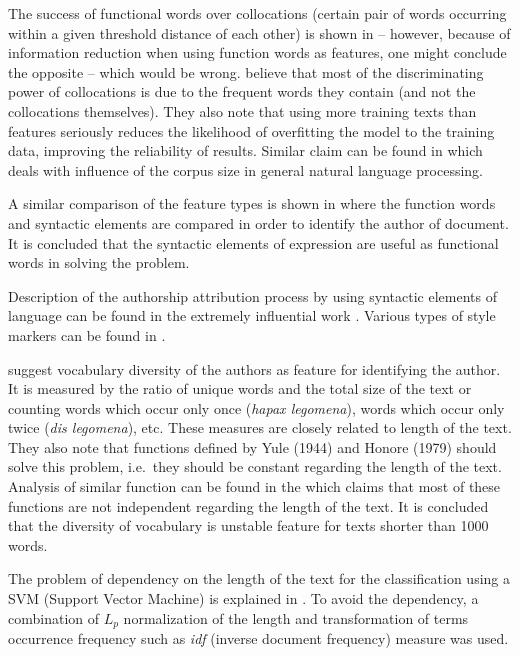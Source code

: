 \documentclass[11pt,english]{article}
\begin{document}
\begin{multicols}{2}
The success of functional words over collocations (certain pair of words
occurring within a given threshold distance of each other) is shown in
\citep{argamon2005measuring} -- however, because of information reduction when 
using function words as features, one might conclude the opposite -- which would be
wrong. \citet{argamon2005measuring} believe that most of the discriminating power
of collocations is due to the frequent words they contain (and not the
collocations themselves). They also note that using more training texts than
features seriously reduces the likelihood of overfitting the model to the
training data, improving the reliability of results. Similar claim can be found
in \citep{banko2001scaling} which deals with influence of the corpus size in
general natural language processing.

A similar comparison of the feature types is shown in
\citep{uzuner2005comparative} where the function words and syntactic
elements are compared in order to identify the author of document. It is
concluded that the syntactic elements of expression are useful as functional words in solving the
problem.

Description of the authorship attribution process by using syntactic elements
of language can be found in the extremely influential work
\citep{stamatatos2001computer}. Various types of style markers can be found in
\citep{luyckx2005shallow}.

\citet{stamatatos2001computer} suggest vocabulary diversity of the authors as
feature for identifying the author. It is measured by the ratio of unique words
and the total size of the text or counting words which occur only once
(\emph{hapax legomena}), words which occur only twice (\emph{dis legomena}), etc.
These measures are closely related to length of the text. They also note that
functions defined by Yule (1944) and Honore (1979) should solve this problem,
i.e.\ they should be constant regarding the length of the text. Analysis of
similar function can be found in the \citep{tweedie1998variable} which claims
that most of these functions are not independent regarding the length of the
text. It is concluded that the diversity of vocabulary is unstable feature for
texts shorter than 1000 words.

The problem of dependency on the length of the text for the classification using
a SVM (Support Vector Machine) is explained in \citep{diederich2003authorship}.
To avoid the dependency, a combination of $L_p$ normalization of the
length and transformation of terms occurrence frequency such as \emph{idf}
(inverse document frequency) measure was used.


\end{multicols}
\end{document}
